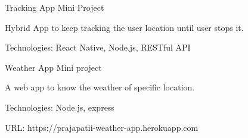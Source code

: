 \begin{cventries}
    \cventry
    {} %
    {Tracking App} %
    {Mini Project} %
    {} %
    {
      \begin{cvitems} %
      	\item {Hybrid App to keep tracking the user location until user stops it.}
      	\item {Technologies: React Native, Node.js, RESTful API}
    \end{cvitems}
    }
    
    
  \cventry
    {} %
    {Weather App} %
    {Mini project} %
    {} %
    {
      \begin{cvitems} %
      	\item {A web app to know the weather of specific location. }
      	\item {Technologies: Node.js, express}
      	\item {URL: https://prajapatii-weather-app.herokuapp.com}
      \end{cvitems}
    }
    
\end{cventries}